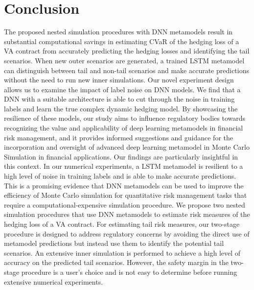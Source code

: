 \section{Conclusion} \label{sec2:conclusion}
The proposed nested simulation procedures with DNN metamodels result in substantial computational savings in estimating CVaR of the hedging loss of a VA contract from accurately predicting the hedging losses and identifying the tail scenarios.
When new outer scenarios are generated, a trained LSTM metamodel can distinguish between tail and non-tail scenarios and make accurate predictions without the need to run new inner simulations.
Our novel experiment design allows us to examine the impact of label noise on DNN models.
We find that a DNN with a suitable architecture is able to cut through the noise in training labels and learn the true complex dynamic hedging model.
By showcasing the resilience of these models, our study aims to influence regulatory bodies towards recognizing the value and applicability of deep learning metamodels in financial risk management, and it provides informed suggestions and guidance for the incorporation and oversight of advanced deep learning metamodel in Monte Carlo Simulation in financial applications.
Our findings are particularly insightful in this context.
In our numerical experiments, a LSTM metamodel is resilient to a high level of noise in training labels and is able to make accurate predictions. 
This is a promising evidence that DNN metamodels can be used to improve the efficiency of Monte Carlo simulation for quantitative risk management tasks that require a computational-expensive simulation procedure.
We propose two nested simulation procedures that use DNN metamodels to estimate risk measures of the hedging loss of a VA contract.
For estimating tail risk measures, our two-stage procedure is designed to address regulatory concerns by avoiding the direct use of metamodel predictions but instead use them to identify the potential tail scenarios.
An extensive inner simulation is performed to achieve a high level of accuracy on the predicted tail scenarios.
However, the safety margin in the two-stage procedure is a user's choice and is not easy to determine before running extensive numerical experiments.

